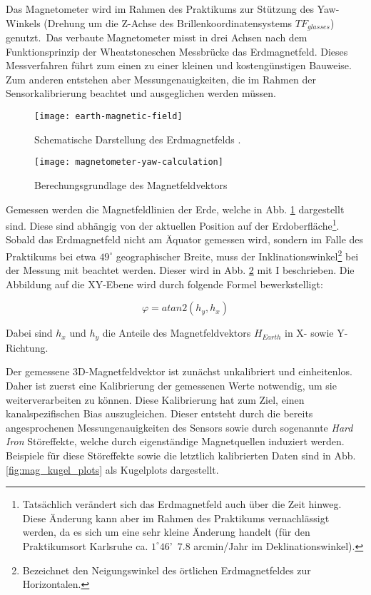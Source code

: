 Das Magnetometer wird im Rahmen des Praktikums zur Stützung des Yaw-Winkels (Drehung um die Z-Achse des Brillenkoordinatensystems $TF_{glasses}$) genutzt.\
Das verbaute Magnetometer misst in drei Achsen nach dem Funktionsprinzip der Wheatstoneschen Messbrücke \cite{renaudin2010complete} das Erdmagnetfeld.
Dieses Messverfahren führt zum einen zu einer kleinen und kostengünstigen Bauweise.
Zum anderen entstehen aber Messungenauigkeiten, die im Rahmen der Sensorkalibrierung beachtet und ausgeglichen werden müssen.

\begin{figure}[h]
   \centering
   \texttt{[image: earth-magnetic-field]}
   \caption[mag_world]{Schematische Darstellung des Erdmagnetfelds \cite{mag_world_source}.}
   \label{fig:mag_world}
\end{figure}

\begin{figure}[h]
   \centering
   \texttt{[image: magnetometer-yaw-calculation]}
   \caption[mag_mapping]{Berechungsgrundlage des Magnetfeldvektors}
   \label{fig:mag_mapping}
\end{figure}

Gemessen werden die Magnetfeldlinien der Erde, welche in Abb. \ref{fig:mag_world} dargestellt sind.
Diese sind abhängig von der aktuellen Position auf der Erdoberfläche\footnote{Tatsächlich verändert sich das Erdmagnetfeld auch über die Zeit hinweg.
Diese Änderung kann aber im Rahmen des Praktikums vernachlässigt werden, da es sich um eine sehr kleine Änderung handelt (\zB für den Praktikumsort Karlsruhe ca. $1^\circ 46$'~$7.8$ arcmin/Jahr im Deklinationswinkel).}.
Sobald das Erdmagnetfeld nicht am Äquator gemessen wird, sondern im Falle des Praktikums bei etwa $49^\circ$ geographischer Breite, muss der Inklinationswinkel\footnote{Bezeichnet den Neigungswinkel des örtlichen Erdmagnetfeldes zur Horizontalen.} bei der Messung mit beachtet werden.
Dieser wird in Abb. \ref{fig:mag_mapping} mit I beschrieben.
Die Abbildung auf die XY-Ebene wird durch folgende Formel bewerkstelligt:

\begin{equation}
    \varphi = atan2(h_y,h_x)
\end{equation}

Dabei sind $h_x$ und $h_y$ die Anteile des Magnetfeldvektors $H_{Earth}$ in X- sowie Y-Richtung.

Der gemessene 3D-Magnetfeldvektor ist zunächst unkalibriert und einheitenlos.
Daher ist zuerst eine Kalibrierung der gemessenen Werte notwendig, um sie weiterverarbeiten zu können.
Diese Kalibrierung hat zum Ziel, einen kanalspezifischen Bias auszugleichen. 
Dieser entsteht durch die bereits angesprochenen Messungenauigkeiten des Sensors sowie durch sogenannte \textit{Hard Iron} Störeffekte, welche durch eigenständige Magnetquellen induziert werden.
Beispiele für diese Störeffekte sowie die letztlich kalibrierten Daten sind in Abb. \ref{fig:mag_kugel_plots} als Kugelplots dargestellt.

